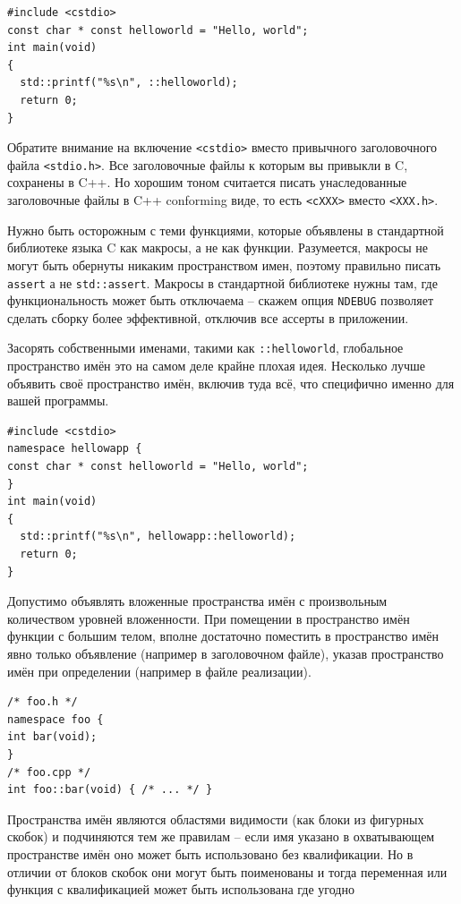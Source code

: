 \documentclass[a4paper,12pt,oneside]{article}
\begin{document}
\begin{lstlisting}
#include <cstdio>
const char * const helloworld = "Hello, world";
int main(void)
{
  std::printf("%s\n", ::helloworld);
  return 0;
}
\end{lstlisting}

Обратите внимание на включение \lstinline!<cstdio>! вместо привычного заголовочного файла \lstinline!<stdio.h>!. Все заголовочные файлы к которым вы привыкли в C, сохранены в C++. Но хорошим тоном считается писать унаследованные заголовочные файлы в C++ conforming виде, то есть \lstinline!<cXXX>! вместо \lstinline!<XXX.h>!.

Нужно быть осторожным с теми функциями, которые объявлены в стандартной библиотеке языка C как макросы, а не как функции. Разумеется, макросы не могут быть обернуты никаким пространством имен, поэтому правильно писать \lstinline!assert! а не \lstinline!std::assert!. Макросы в стандартной библиотеке нужны там, где функциональность может быть отключаема -- скажем опция \lstinline!NDEBUG! позволяет сделать сборку более эффективной, отключив все ассерты в приложении. 

Засорять собственными именами, такими как \lstinline!::helloworld!, глобальное пространство имён это на самом деле крайне плохая идея. Несколько лучше объявить своё пространство имён, включив туда всё, что специфично именно для вашей программы.

\begin{lstlisting}
#include <cstdio>
namespace hellowapp {
const char * const helloworld = "Hello, world";
}
int main(void)
{
  std::printf("%s\n", hellowapp::helloworld);
  return 0;
}
\end{lstlisting}

Допустимо объявлять вложенные пространства имён с произвольным количеством уровней вложенности. При помещении в пространство имён функции с большим телом, вполне достаточно поместить в пространство имён явно только объявление (например в заголовочном файле), указав пространство имён при определении (например в файле реализации).

\begin{lstlisting}
/* foo.h */
namespace foo {
int bar(void);
}
/* foo.cpp */
int foo::bar(void) { /* ... */ }
\end{lstlisting}

Пространства имён являются областями видимости (как блоки из фигурных скобок) и подчиняются тем же правилам – если имя указано в охватывающем пространстве имён оно может быть использовано без квалификации. Но в отличии от блоков скобок они могут быть поименованы и тогда переменная или функция с квалификацией может быть использована где угодно
\end{document}
